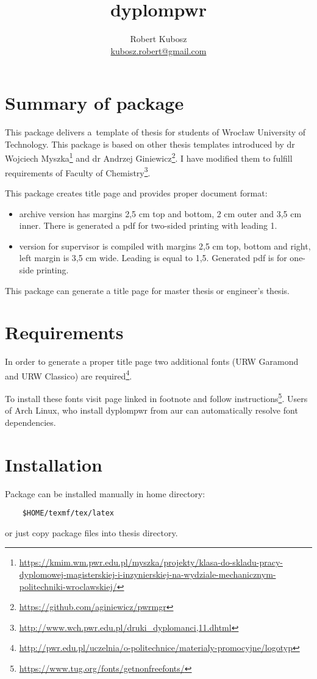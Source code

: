 \documentclass[12pt,a4paper]{article}
\author{Robert Kubosz \\ \href{mailto:kubosz.robert@gmail.com}{kubosz.robert@gmail.com}}
\title{dyplompwr}
\begin{document}
\maketitle
\section{Summary of package}
\label{sec:wstep}
\par This package delivers a~template of thesis for students of Wrocław
University of Technology. This package is based on other thesis templates
introduced by dr Wojciech
Myszka\footnote{\url{https://kmim.wm.pwr.edu.pl/myszka/projekty/klasa-do-skladu-pracy-dyplomowej-magisterskiej-i-inzynierskiej-na-wydziale-mechanicznym-politechniki-wroclawskiej/}}
and dr Andrzej Giniewicz\footnote{\url{https://github.com/aginiewicz/pwrmgr}}.
I have modified them to fulfill requirements of Faculty of
Chemistry\footnote{\url{http://www.wch.pwr.edu.pl/druki_dyplomanci,11.dhtml}}.
\par This package creates title page and provides proper document format:
\begin{itemize}
    \item archive version has margins 2,5 cm top and bottom, 2 cm outer and 3,5
        cm inner. There is generated a pdf for two-sided printing with leading
        1.
    \item version for supervisor is compiled with margins 2,5 cm top, bottom
        and right, left margin is 3,5 cm wide. Leading is equal to 1,5.
        Generated pdf is for one-side printing.
\end{itemize}
This package can generate a title page for master thesis or engineer's thesis.
\section{Requirements}
\par In order to generate a proper title page two additional fonts (URW
Garamond and URW Classico)  are
required\footnote{\url{http://pwr.edu.pl/uczelnia/o-politechnice/materialy-promocyjne/logotyp}}.
\par To install these fonts visit page linked in footnote and follow
instructions\footnote{\url{https://www.tug.org/fonts/getnonfreefonts/}}. Users
of Arch Linux, who install dyplompwr from aur can automatically resolve font
dependencies.

\section{Installation}
Package can be installed manually in home directory:
\begin{verbatim}
    $HOME/texmf/tex/latex
\end{verbatim}
or just copy package files into thesis directory.
\end{document}
